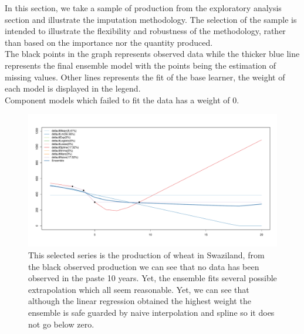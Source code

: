 \documentclass[nojss]{jss}\usepackage[]{graphicx}\usepackage[]{color}
\makeatletter
\def\maxwidth{ %
  \ifdim\Gin@nat@width>\linewidth
    \linewidth
  \else
    \Gin@nat@width
  \fi
}
\newenvironment{knitrout}{}{} %
\makeatother
\begin{document}
In this section, we take a sample of production from the exploratory
analysis section and illustrate the imputation methodology. The
selection of the sample is intended to illustrate the flexibility and
robustness of the methodology, rather than based on the importance nor
the quantity produced.\\

The black points in the graph represents observed data while the
thicker blue line represents the final ensemble model with the points
being the estimation of missing values. Other lines represents the fit
of the base learner, the weight of each model is displayed in the
legend.\\

Component models which failed to fit the data has a weight of 0.\\

\begin{knitrout}
\color{fgcolor}\begin{figure}[!ht]


{\centering \includegraphics[width=\maxwidth]{figure/wheat-swaziland-impute} 

}

\caption[This selected series is the production of wheat in Swaziland, from the black observed production we can see that no data has been observed in the paste 10 years]{This selected series is the production of wheat in Swaziland, from the black observed production we can see that no data has been observed in the paste 10 years. Yet, the ensemble fits several possible extrapolation which all seem reasonable. Yet, we can see that although the linear regression obtained the highest weight the ensemble is safe guarded by naive interpolation and spline so it does not go below zero.\label{fig:wheat-swaziland-impute}}
\end{figure}


\end{knitrout}
\end{document}
